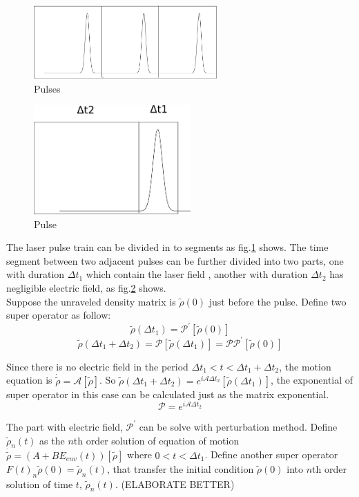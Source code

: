 \documentclass[11pt,a4paper]{article}
\begin{document}
\begin{figure}[H]
  \centering
  \includegraphics[width=7cm]{pulses.pdf}
  \caption{Pulses}
  \label{fig:pulses}
\end{figure}
\begin{figure}[H]
  \centering
  \includegraphics[width=6cm]{pulse.pdf}
  \caption{Pulse}
  \label{fig:pulse}
\end{figure}
The laser pulse train can be divided in to segments as fig.\ref{fig:pulses} shows. The time segment between two adjacent pulses can be further divided into two parts, one with duration $\Delta t_1$ which contain the laser field , another with duration $\Delta t_{2}$ has negligible electric field, as fig.\ref{fig:pulse} shows.\\

Suppose the unraveled density matrix is $\tilde{\rho}(0)$ just before the pulse. Define two super operator as follow:
\[
\tilde{\rho}(\Delta t_1) = \mathcal{P}^{\prime} \left[ \tilde{\rho}(0) \right]
\]
\[
\tilde{\rho}(\Delta t_1+\Delta t_2) = \mathcal{P} \left[\tilde{\rho}(\Delta t_{1})\right] = \mathcal{P} \mathcal{P}^{\prime} \left[\tilde{\rho}(0)\right]
\]

Since there is no electric field in the period $\Delta t_1<t<\Delta t_1+\Delta t_2$, the motion equation is $\dot{\tilde{\rho}} = \mathcal{A} \left[\tilde{\rho}\right]$. So $\tilde{\rho}(\Delta t_1+\Delta t_2) = e^{i \mathcal{A} \Delta t_{2}} \left[ \tilde{\rho}(\Delta t_{1}) \right] $, the exponential of super operator in this case can be calculated just as the matrix exponential.
\[
\mathcal{P} = e^{i \mathcal{A} \Delta t_2}
\]

The part with electric field, $\mathcal{P}^{\prime}$ can be solve with perturbation method. Define $\tilde{\rho}_n (t)$ as the $n$th order solution of equation of motion $\dot{\tilde{\rho}} = \left( A + B E_{env}(t) \right) \left[ \tilde{\rho} \right] $ where $0< t < \Delta t_{1}$. Define another super operator $F(t)_{n} \tilde{\rho}(0) = \tilde{\rho}_{n}(t)$, that transfer the initial condition $\tilde{\rho}(0)$ into $n$th order solution of time $t$, $\tilde{\rho}_n (t)$. (ELABORATE BETTER)%
\end{document}
